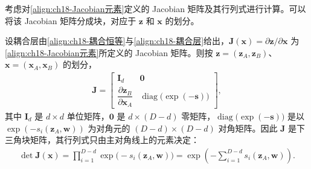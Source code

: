 \documentclass[../../main.tex]{subfiles}
\begin{document}
考虑对\eqref{align:ch18-Jacobian元素}定义的 Jacobian 矩阵及其行列式进行计算。可以将该 Jacobian 矩阵分成块，对应于 $\bm{z}$ 和 $\bm{x}$ 的划分。

\begin{proposition}\label{proposition:ch18-耦合层行列式}
设耦合层由\eqref{align:ch18-耦合恒等}与\eqref{align:ch18-耦合层}给出，$\bm{J}(\bm{x})=\partial\bm{z}/\partial\bm{x}$ 为\eqref{align:ch18-Jacobian元素}所定义的 Jacobian 矩阵。则按 $\bm{z}=(\bm{z}_A,\bm{z}_B)$、$\bm{x}=(\bm{x}_A,\bm{x}_B)$ 的划分，
\begin{align}
  \bm{J}=\begin{bmatrix}\bm{I}_d & \bm{0}\\[2pt] \dfrac{\partial\bm{z}_B}{\partial\bm{x}_A} & \operatorname{diag}\big(\exp(-\bm{s})\big)\end{bmatrix},
  \label{align:ch18-耦合Jacobian}
\end{align}
其中 $\bm{I}_d$ 是 $d\times d$ 单位矩阵，$\bm{0}$ 是 $d\times(D-d)$ 零矩阵，$\operatorname{diag}\big(\exp(-\bm{s})\big)$ 是以 $\exp(-s_i(\bm{z}_A,\bm{w}))$ 为对角元的 $(D-d)\times(D-d)$ 对角矩阵。因此 $\bm{J}$ 是下三角块矩阵，其行列式只由主对角线上的元素决定：
\begin{align}
  \det\bm{J}(\bm{x})=\prod_{i=1}^{D-d}\exp\big(-s_i(\bm{z}_A,\bm{w})\big)=\exp\left(-\sum_{i=1}^{D-d}s_i(\bm{z}_A,\bm{w})\right).\label{align:ch18-耦合行列式}
\end{align}
\end{proposition}
\end{document}
